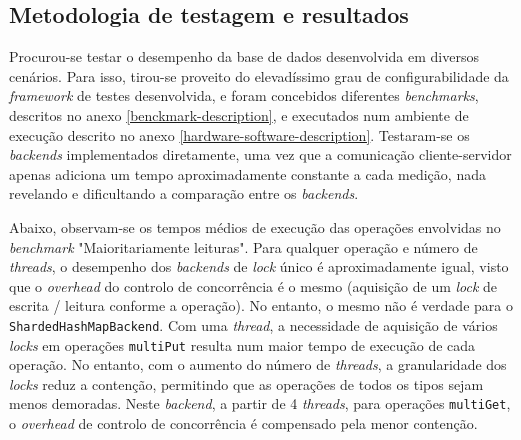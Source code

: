 \documentclass[11pt, a4paper]{article}
\begin{document}
\subsection{Metodologia de testagem e resultados}

Procurou-se testar o desempenho da base de dados desenvolvida em diversos cenários. Para isso,
tirou-se proveito do elevadíssimo grau de configurabilidade da \emph{framework} de testes
desenvolvida, e foram concebidos diferentes \emph{benchmarks}, descritos no anexo
\ref{benckmark-description}, e executados num ambiente de execução descrito no anexo
\ref{hardware-software-description}. Testaram-se os \emph{backends} implementados diretamente, uma
vez que a comunicação cliente-servidor apenas adiciona um tempo aproximadamente constante a cada
medição, nada revelando e dificultando a comparação entre os \emph{backends}.

Abaixo, observam-se os tempos médios de execução das operações envolvidas no \emph{benchmark}
"Maioritariamente leituras"{}. Para qualquer operação e número de \emph{threads}, o desempenho dos
\emph{backends} de \emph{lock} único é aproximadamente igual, visto que o \emph{overhead} do
controlo de concorrência é o mesmo (aquisição de um \emph{lock} de escrita / leitura conforme a
operação). No entanto, o mesmo não é verdade para o \texttt{ShardedHashMapBackend}. Com uma
\emph{thread}, a necessidade de aquisição de vários \emph{locks} em operações \texttt{multiPut}
resulta num maior tempo de execução de cada operação. No entanto, com o aumento do número de
\emph{threads}, a granularidade dos \emph{locks} reduz a contenção, permitindo que as operações de
todos os tipos sejam menos demoradas. Neste \emph{backend}, a partir de 4 \emph{threads}, para
operações \texttt{multiGet}, o \emph{overhead} de controlo de concorrência é compensado pela menor
contenção.
\end{document}
